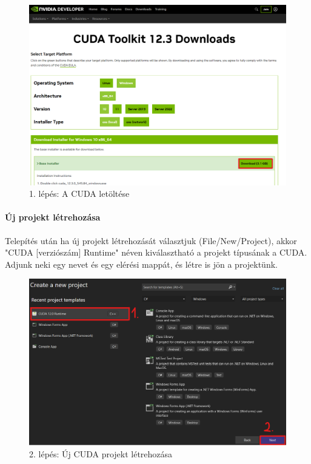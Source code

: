 \begin{figure}[ht!]
	\centering
	\includegraphics[width=150mm, keepaspectratio] {figures/install-1.png}
	\caption{1. lépés: A CUDA letöltése}
\end{figure}

\paragraph{Új projekt létrehozása}
Telepítés után ha új projekt létrehozását választjuk (File/New/Project), akkor "CUDA [verziószám] Runtime" néven kiválasztható a projekt típusának a CUDA. Adjunk neki egy nevet és egy elérési mappát, és létre is jön a projektünk.

\begin{figure}[ht!]
	\centering
	\includegraphics[width=150mm, keepaspectratio] {figures/install-2.png}
	\caption{2. lépés: Új CUDA projekt létrehozása}
\end{figure}

